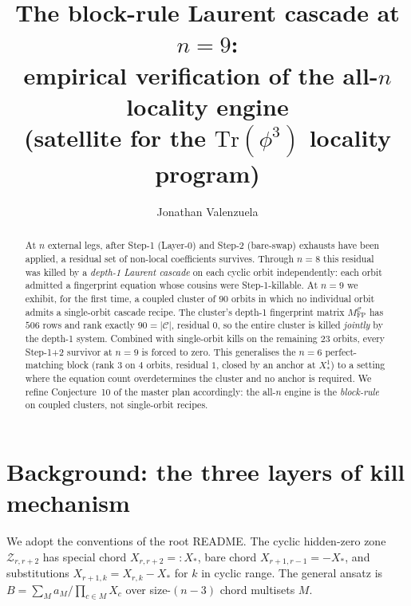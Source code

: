\documentclass[11pt]{article}
\title{The block-rule Laurent cascade at $n=9$:\\
       \large empirical verification of the all-$n$ locality engine\\
       \small{(satellite for the $\mathrm{Tr}(\phi^3)$ locality program)}}
\author{Jonathan Valenzuela}
\date{}
\theoremstyle{definition}
\begin{document}
\maketitle

\begin{abstract}
At $n$ external legs, after Step-1 (Layer-0) and Step-2 (bare-swap)
exhausts have been applied, a residual set of non-local coefficients
survives. Through $n=8$ this residual was killed by a \emph{depth-1
Laurent cascade} on each cyclic orbit independently: each orbit
admitted a fingerprint equation whose cousins were Step-1-killable.
At $n=9$ we exhibit, for the first time, a coupled cluster of $90$
orbits in which no individual orbit admits a single-orbit cascade
recipe. The cluster's depth-1 fingerprint matrix
$M_{\mathrm{FP}}^{\mathcal{C}}$ has $506$ rows and rank exactly
$90 = |\mathcal{C}|$, residual $0$, so the entire cluster is killed
\emph{jointly} by the depth-1 system. Combined with single-orbit
kills on the remaining $23$ orbits, every Step-1+2 survivor at $n=9$
is forced to zero. This generalises the $n=6$ perfect-matching block
(rank $3$ on $4$ orbits, residual $1$, closed by an anchor at
$X_*^{1}$) to a setting where the equation count overdetermines the
cluster and no anchor is required. We refine Conjecture~10 of the
master plan accordingly: the all-$n$ engine is the
\emph{block-rule} on coupled clusters, not single-orbit recipes.
\end{abstract}

\section{Background: the three layers of kill mechanism}\label{sec:layers}

We adopt the conventions of the root README. The cyclic hidden-zero
zone $\mathcal Z_{r,r+2}$ has special chord $X_{r,r+2}=:X_*$, bare
chord $X_{r+1,r-1}=-X_*$, and substitutions
$X_{r+1,k}=X_{r,k}-X_*$ for $k$ in cyclic range. The general
ansatz is $B=\sum_M a_M/\prod_{c\in M}X_c$ over size-$(n-3)$ chord
multisets $M$.
\end{document}
